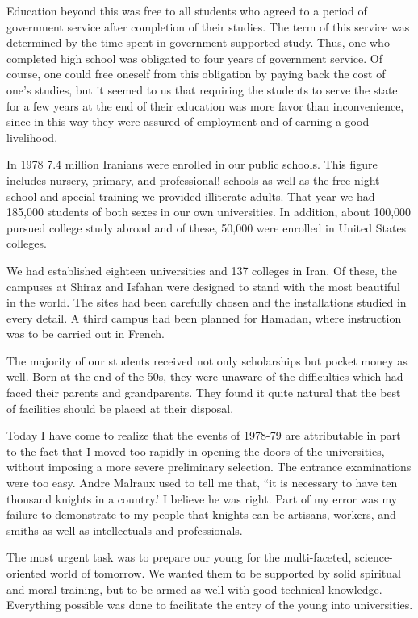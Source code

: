 Education beyond this was free to all students who agreed to a period of government service after completion of their studies. The term of this service was determined by the time spent in government supported study. Thus, one who completed high school was obligated to four years of government service. Of course, one could free oneself from this obligation by paying back the cost of one’s studies, but it seemed to us that requiring the students to serve the state for a few years at the end of their education was more favor than inconvenience, since in this way they were assured of employment and of earning a good livelihood. 

In 1978 7.4 million Iranians were enrolled in our public schools. This figure includes nursery, primary, and professional! schools as well as the free night school and special training we provided illiterate adults. That year we had 185,000 students of both sexes in our own universities. In addition, about 100,000 pursued college study abroad and of these, 50,000 were enrolled in United States colleges. 

We had established eighteen universities and 137 colleges in Iran. Of these, the campuses at Shiraz and Isfahan were designed to stand with the most beautiful in the world. The sites had been carefully chosen and the installations studied in every detail. A third campus had been planned for Hamadan, where instruction was to be carried out in French. 

The majority of our students received not only scholarships but pocket money as well. Born at the end of the 50s, they were unaware of the difficulties which had faced their parents and grandparents. They found it quite natural that the best of facilities should be placed at their disposal. 

Today I have come to realize that the events of 1978-79 are attributable in part to the fact that I moved too rapidly in opening the doors of the universities, without imposing a more severe preliminary selection. The entrance examinations were too easy. Andre Malraux used to tell me that, “it is necessary to have ten thousand knights in a country.’ I believe he was right. Part of my error was my failure to demonstrate to my people that knights can be artisans, workers, and smiths as well as intellectuals and professionals. 

The most urgent task was to prepare our young for the multi-faceted, science-oriented world of tomorrow. We wanted them to be supported by solid spiritual and moral training, but to be armed as well with good technical knowledge. Everything possible was done to facilitate the entry of the young into universities. 

